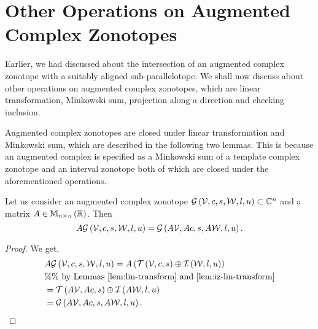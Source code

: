\section{Other Operations on Augmented Complex Zonotopes}
Earlier, we had discussed about the intersection of an augmented
complex zonotope with a suitably aligned sub-parallelotope.  We shall
now discuss about other operations on augmented complex zonotopes, which
are linear transformation, Minkowski sum, projection along a direction
and checking inclusion.

Augmented complex zonotopes are closed under linear transformation and
Minkowski sum, which are described in the following two lemmas.  This
is because an augmented complex is specified as a Minkowski sum of a template
complex zonotope and an interval zonotope both of which are closed
under the aforementioned operations.
%
\begin{lemma}
Let us consider an augmented complex zonotope
$\mathcal{G}\left(\mathcal{V},c,s,\mathcal{W},l,u\right)\subset \mathbb{C}^n$
and a matrix $A\in\mathbb{M}_{n\times n}\left(\mathbb{R}\right)$.  Then
%
\[
A\mathcal{G}\left(\mathcal{V},c,s,\mathcal{W},l,u\right)=\mathcal{G}\left(A\mathcal{V},Ac,s,A\mathcal{W},l,u\right).
\]
%
\end{lemma}
%
\begin{proof}
  We get,
  \begin{align*}
    & A\mathcal{G}\left(\mathcal{V},c,s,\mathcal{W},l,u\right)=
    A\left(\mathit{\operatorname{\mathcal{T}}}\left(\mathcal{V},c,s\right)\oplus \mathit{\operatorname{\mathcal{I}}}\left(\mathcal{W},l,u\right)\right)\\
    & \%\%~\text{by Lemmas~\ref{lem:lin-transform} and~\ref{lem:iz-lin-transform}}\\
    &
    = \mathit{\operatorname{\mathcal{T}}}\left(A\mathcal{V},Ac,s\right)\oplus \mathit{\operatorname{\mathcal{I}}}\left(A\mathcal{W},l,u\right)\\
    & = \mathcal{G}\left(A\mathcal{V},Ac,s,A\mathcal{W},l,u\right).~~~~~~~~~~~~~\qedhere
  \end{align*}
\end{proof}
%
